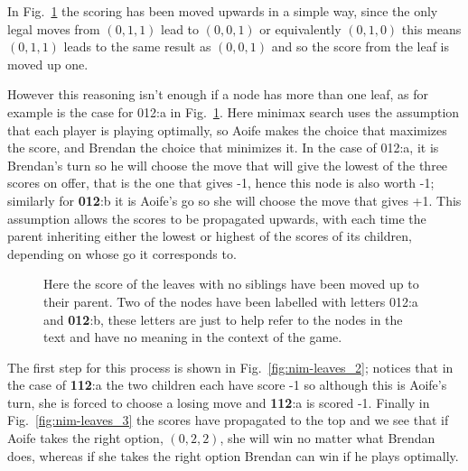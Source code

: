 \documentclass[11pt,a4paper]{scrartcl}
\begin{document}
{In Fig.~\ref{fig:nim-leaves_1} the scoring has been moved upwards in a
simple way, since the only legal moves from $(0,1,1)$ lead to
$(0,0,1)$ or equivalently $(0,1,0)$ this means $(0,1,1)$ leads to the
same result as $(0,0,1)$ and so the score from the leaf is moved up
one. 

However this reasoning isn't enough if a node has more than one leaf,
as for example is the case for 012:a in
Fig.~\ref{fig:nim-leaves_1}. Here minimax search uses the
assumption that each player is playing optimally, so Aoife makes the
choice that maximizes the score, and Brendan the choice that minimizes
it. In the case of 012:a, it is Brendan's turn so he will choose the
move that will give the lowest of the three scores on offer, that is
the one that gives -1, hence this node is also worth -1; similarly for
\textbf{012}:b it is Aoife's go so she will choose the move that gives
+1. This assumption allows the scores to be propagated upwards, with
each time the parent inheriting either the lowest or highest of the
scores of its children, depending on whose go it corresponds to. 

\begin{figure}
\begin{center}
\end{center}
\caption{Here the score of the leaves with no siblings have been moved
  up to their parent. Two of the nodes have been labelled with letters
  012:a and \textbf{012}:b, these letters are just to help refer to
  the nodes in the text and have no meaning in the context of the
  game. \label{fig:nim-leaves_1}}
\end{figure}


The first step for this process is shown in
Fig.~\ref{fig:nim-leaves_2}; notices that in the case of
\textbf{112}:a the two children each have score -1 so although this is
Aoife's turn, she is forced to choose a losing move and \textbf{112}:a
is scored -1. Finally in Fig.~\ref{fig:nim-leaves_3} the scores have
propagated to the top and we see that if Aoife takes the right option,
$(0,2,2)$, she will win no matter what Brendan does, whereas if she
takes the right option Brendan can win if he plays optimally.


}
\end{document}
